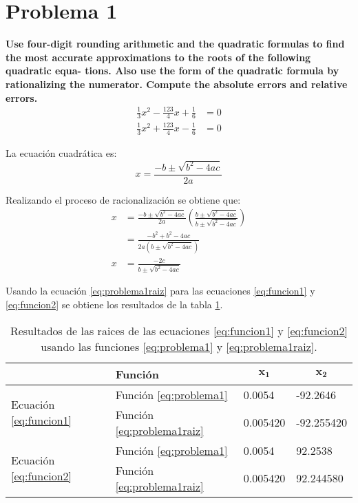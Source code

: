\section*{Problema 1}
\textbf{Use four-digit rounding arithmetic and the quadratic formulas to find the
    most accurate approximations to the roots of the following quadratic equa-
    tions. Also use the form of the quadratic formula by rationalizing the
    numerator. Compute the absolute errors and relative errors.}
\begin{align}
    \frac{1}{3}x^2 - \frac{123}{4}x +\frac{1}{6} & = 0 \label{eq:funcion1} \\
    \frac{1}{3}x^2 + \frac{123}{4}x -\frac{1}{6} & = 0 \label{eq:funcion2}
\end{align}

La ecuación cuadrática es:
\begin{equation}
    x = \frac{-b\pm \sqrt{b^2-4ac}}{2a}
    \label{eq:problema1}
\end{equation}

Realizando el proceso de racionalización se obtiene que:
\begin{align}
    x & = \frac{-b\pm \sqrt{b^2-4ac}}{2a}\left(\frac{b\pm \sqrt{b^2-4ac}}{b\pm \sqrt{b^2-4ac}}\right) \nonumber \\
      & = \frac{-b^2+b^2-4ac}{2a(b\pm \sqrt{b^2-4ac})}                                   \nonumber              \\
    x & = \frac{-2c}{b\pm \sqrt{b^2-4ac}} \label{eq:problema1raiz}
\end{align}

Usando la ecuación \ref{eq:problema1raiz} para las ecuaciones \ref{eq:funcion1} y \ref{eq:funcion2} se obtiene los resultados de la tabla \ref{table:resultados1}.
\begin{table}[H]
    \centering
    \begin{tabular}{llll} \hline
        \textbf{}                                   & \textbf{Función}               & \multicolumn{1}{c}{$\mathbf{x_1}$} & \multicolumn{1}{c}{$\mathbf{x_2}$} \\ \hline
        \multirow{2}{*}{Ecuación \ref{eq:funcion1}} & Función \ref{eq:problema1}     & 0.0054                             & -92.2646                           \\
                                                    & Función \ref{eq:problema1raiz} & 0.005420                           & -92.255420                         \\
        \multirow{2}{*}{Ecuación \ref{eq:funcion2}} & Función \ref{eq:problema1}     & 0.0054                             & 92.2538                            \\
                                                    & Función \ref{eq:problema1raiz} & 0.005420                           & 92.244580                          \\ \hline
    \end{tabular}
    \caption{Resultados de las raices de las ecuaciones \ref{eq:funcion1} y \ref{eq:funcion2} usando las funciones \ref{eq:problema1} y \ref{eq:problema1raiz}.}
    \label{table:resultados1}
\end{table}


